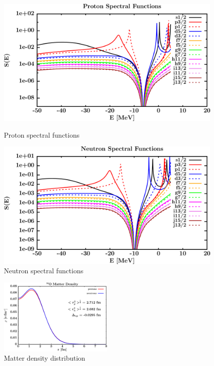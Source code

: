 \begin{figure}[H]
    \centering
    \begin{minipage}{0.45\textwidth}
        \centering
        \includegraphics[width=1.0\textwidth]{figures/o16_protonSpectralFunctions.png}
        \caption{Proton spectral functions}
        \label{DOMFitData_o16_proton_spectralFunctions}
    \end{minipage}\hfill
    \begin{minipage}{0.45\textwidth}
        \centering
        \includegraphics[width=1.0\textwidth]{figures/o16_neutronSpectralFunctions.png}
        \caption{Neutron spectral functions}
        \label{DOMFitData_o16_neutron_spectralFunctions}
    \end{minipage}
\end{figure}

\begin{figure}[H]
    \centering
    \includegraphics[width = 0.5\textwidth]{figures/o16_matterDensity.png}
    \caption{Matter density distribution}
    \label{DOMFitData_o16_matterDensity}
\end{figure}


